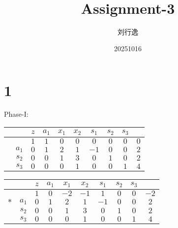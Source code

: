 \documentclass[a4paper,12pt]{article}
\title{Assignment-3}
\author{刘行逸}
\date{20251016}
\begin{document}
\maketitle

\section*{1}
Phase-I:
\begin{table}[H]
    \footnotesize
    \begin{tabular}{cc|ccccccc|c}
         &       & $z$ & $a_1$ & $x_1$ & $x_2$ & $s_1$ & $s_2$ & $s_3$ &     \\
        \hline
         &       & $1$ & $1$   & $0$   & $0$   & $0$   & $0$   & $0$   & $0$ \\
        \hline
         & $a_1$ & $0$ & $1$   & $2$   & $1$   & $-1$  & $0$   & $0$   & $2$ \\
         & $s_2$ & $0$ & $0$   & $1$   & $3$   & $0$   & $1$   & $0$   & $2$ \\
         & $s_3$ & $0$ & $0$   & $0$   & $1$   & $0$   & $0$   & $1$   & $4$ \\
    \end{tabular}
\end{table}

\begin{table}[H]
    \footnotesize
    \begin{tabular}{cc|ccccccc|c}
            &       & $z$ & $a_1$ & $x_1$ & $x_2$ & $s_1$ & $s_2$ & $s_3$ &      \\
        \hline
            &       & $1$ & $0$   & $-2$  & $-1$  & $1$   & $0$   & $0$   & $-2$ \\
        \hline
        $*$ & $a_1$ & $0$ & $1$   & $2$   & $1$   & $-1$  & $0$   & $0$   & $2$  \\
            & $s_2$ & $0$ & $0$   & $1$   & $3$   & $0$   & $1$   & $0$   & $2$  \\
            & $s_3$ & $0$ & $0$   & $0$   & $1$   & $0$   & $0$   & $1$   & $4$  \\
    \end{tabular}
\end{table}
\end{document}
